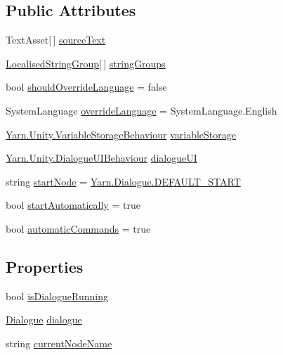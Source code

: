 \subsection*{Public Attributes}
\begin{DoxyCompactItemize}
\item 
Text\-Asset\mbox{[}$\,$\mbox{]} \hyperlink{a00073_a71eae33d06990a3aec5d444fae017492}{source\-Text}
\item 
\hyperlink{a00109_de/dab/a00319}{Localised\-String\-Group}\mbox{[}$\,$\mbox{]} \hyperlink{a00073_a4d00a0671c2966b88d1c806c675fe915}{string\-Groups}
\item 
bool \hyperlink{a00073_a3e093d36845924378a8b2fd9ea3ac73d}{should\-Override\-Language} = false
\item 
System\-Language \hyperlink{a00073_ad12db159fc3df0819d5b594c33fba834}{override\-Language} = System\-Language.\-English
\item 
\hyperlink{a00167}{Yarn.\-Unity.\-Variable\-Storage\-Behaviour} \hyperlink{a00073_a6cca3d33f8b0ce3e750caed9fd8fc734}{variable\-Storage}
\item 
\hyperlink{a00075}{Yarn.\-Unity.\-Dialogue\-U\-I\-Behaviour} \hyperlink{a00073_ac87fdc65b0be57868f80c0fcd62ffd6d}{dialogue\-U\-I}
\item 
string \hyperlink{a00073_a61c92b8d2228d01d8ac123b73bbb41a0}{start\-Node} = \hyperlink{a00072_a1b643f15f734090e6a58cbf13dafd28f}{Yarn.\-Dialogue.\-D\-E\-F\-A\-U\-L\-T\-\_\-\-S\-T\-A\-R\-T}
\item 
bool \hyperlink{a00073_a6476a987f9788dba653976bcbe72980c}{start\-Automatically} = true
\item 
bool \hyperlink{a00073_a6aac5e877d5396a8141da5e85243f462}{automatic\-Commands} = true
\end{DoxyCompactItemize}
\subsection*{Properties}
\begin{DoxyCompactItemize}
\item 
bool \hyperlink{a00073_a9eb0fd7b600a4667595042832af1d655}{is\-Dialogue\-Running}
\item 
\hyperlink{a00072}{Dialogue} \hyperlink{a00073_a4f9712a847ca6d53ec8d2dd64dfcffd8}{dialogue}
\item 
string \hyperlink{a00073_a8589c66769e89906eaff3c2263bdad5d}{current\-Node\-Name}
\end{DoxyCompactItemize}
